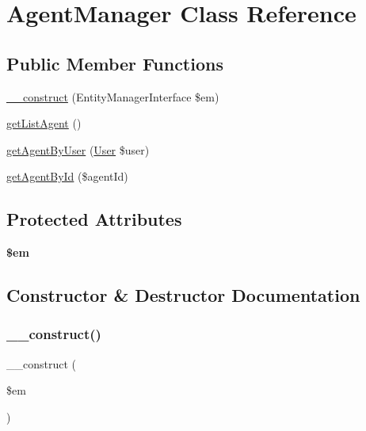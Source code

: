 \hypertarget{class_app_1_1_b_l_1_1_agent_manager}{}\section{Agent\+Manager Class Reference}
\label{class_app_1_1_b_l_1_1_agent_manager}
\subsection*{Public Member Functions}
\begin{DoxyCompactItemize}
\item 
\mbox{\hyperlink{class_app_1_1_b_l_1_1_agent_manager_a25f4258aeb5ce2a61a2504cb7c058485}{\+\_\+\+\_\+construct}} (Entity\+Manager\+Interface \$em)
\item 
\mbox{\hyperlink{class_app_1_1_b_l_1_1_agent_manager_ad0cef713897d88349243a6994a51077d}{get\+List\+Agent}} ()
\item 
\mbox{\hyperlink{class_app_1_1_b_l_1_1_agent_manager_a5cfc4477c12b2aae965668cffc763dfe}{get\+Agent\+By\+User}} (\mbox{\hyperlink{class_app_1_1_entity_1_1_user}{User}} \$user)
\item 
\mbox{\hyperlink{class_app_1_1_b_l_1_1_agent_manager_a2c680eded2c065484bc9a271ac294a20}{get\+Agent\+By\+Id}} (\$agent\+Id)
\end{DoxyCompactItemize}
\subsection*{Protected Attributes}
\begin{DoxyCompactItemize}
\item 
\mbox{\label{class_app_1_1_b_l_1_1_agent_manager_a0f2991d5fed029ef50ef619f1a532d06}} 
{\bfseries \$em}
\end{DoxyCompactItemize}


\subsection{Constructor \& Destructor Documentation}
\mbox{\label{class_app_1_1_b_l_1_1_agent_manager_a25f4258aeb5ce2a61a2504cb7c058485}} 
\subsubsection{\texorpdfstring{\_\_construct()}{\_\_construct()}}
{\footnotesize\ttfamily \+\_\+\+\_\+construct (\begin{DoxyParamCaption}\item[{Entity\+Manager\+Interface}]{\$em }\end{DoxyParamCaption})}

